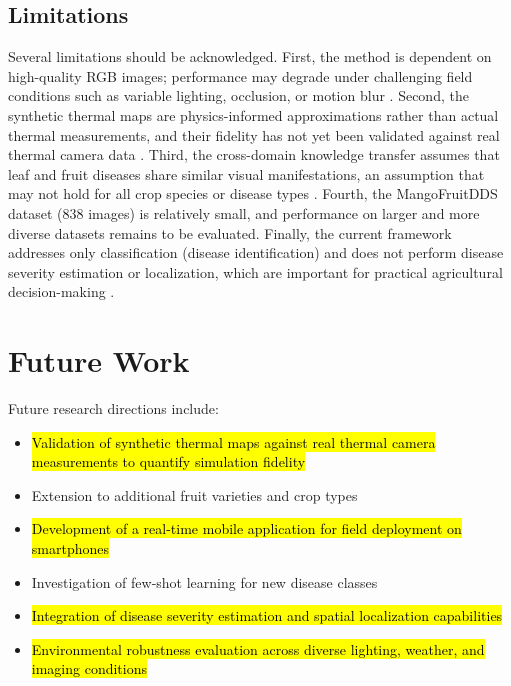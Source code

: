 \documentclass[utf8]{FrontiersinHarvard}
\newenvironment{revblock}{}{}
\begin{document}
\subsection{Limitations}
\begin{revblock}
Several limitations should be acknowledged. First, the method is dependent on high-quality RGB images; performance may degrade under challenging field conditions such as variable lighting, occlusion, or motion blur \cite{kouidri2021}. Second, the synthetic thermal maps are physics-informed approximations rather than actual thermal measurements, and their fidelity has not yet been validated against real thermal camera data \cite{zhai2020}. Third, the cross-domain knowledge transfer assumes that leaf and fruit diseases share similar visual manifestations, an assumption that may not hold for all crop species or disease types \cite{weiss2016}. Fourth, the MangoFruitDDS dataset (838 images) is relatively small, and performance on larger and more diverse datasets remains to be evaluated. Finally, the current framework addresses only classification (disease identification) and does not perform disease severity estimation or localization, which are important for practical agricultural decision-making \cite{wang2022_synthetic}.
\end{revblock}

\section{Future Work}
Future research directions include:
\begin{itemize}
    \item \hl{Validation of synthetic thermal maps against real thermal camera measurements to quantify simulation fidelity}
    \item Extension to additional fruit varieties and crop types
    \item \hl{Development of a real-time mobile application for field deployment on smartphones}
    \item Investigation of few-shot learning for new disease classes
    \item \hl{Integration of disease severity estimation and spatial localization capabilities}
    \item \hl{Environmental robustness evaluation across diverse lighting, weather, and imaging conditions}
\end{itemize}

\FloatBarrier
\end{document}
